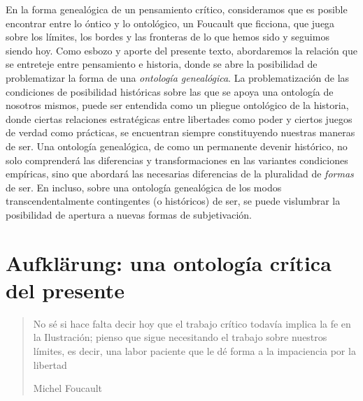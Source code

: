 \documentclass{book}
\begin{document}
En la forma genealógica de un pensamiento crítico, consideramos que es
posible encontrar entre lo óntico y lo ontológico, un Foucault que
ficciona, que juega sobre los límites, los bordes y las fronteras de lo
que hemos sido y seguimos siendo hoy. Como esbozo y aporte del presente
texto, abordaremos la relación que se entreteje entre pensamiento e
historia, donde se abre la posibilidad de problematizar la forma de una
\emph{ontología genealógica}. La problematización de las condiciones de
posibilidad históricas sobre las que se apoya una ontología de nosotros
mismos, puede ser entendida como un pliegue ontológico de la historia,
donde ciertas relaciones estratégicas entre libertades como poder y
ciertos juegos de verdad como prácticas, se encuentran siempre
constituyendo nuestras maneras de ser. Una ontología genealógica, de
como un permanente devenir histórico, no solo comprenderá las
diferencias y transformaciones en las variantes condiciones empíricas,
sino que abordará las necesarias diferencias de la pluralidad de
\emph{formas} de ser. En incluso, sobre una ontología genealógica de los
modos transcendentalmente contingentes (o históricos) de ser, se puede
vislumbrar la posibilidad de apertura a nuevas formas de subjetivación.

\section{Aufklärung: una ontología crítica del presente}

\begin{quote}
No sé si hace falta decir hoy que el trabajo crítico todavía implica la
fe en la Ilustración; pienso que sigue necesitando el trabajo sobre
nuestros límites, es decir, una labor paciente que le dé forma a la
impaciencia por la libertad

Michel Foucault
\end{quote}
\end{document}
